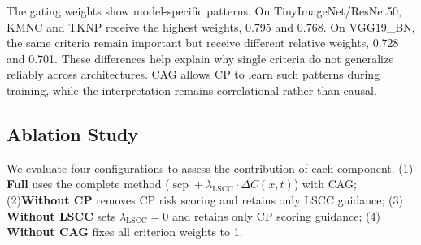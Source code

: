 \documentclass[preprint,number,5p,twocolumn]{elsarticle}
\DeclareMathOperator{\scp}{scp}
\begin{document}
\begin{table}[!htbp]
  \centering
  \caption{Criterion importance ranking on TinyImageNet. Higher values indicate greater contribution to fault prediction.}\label{tab:feature-importance}
\end{table}
The gating weights show model-specific patterns. On TinyImageNet/ResNet50, KMNC and TKNP receive the highest weights, 0.795 and 0.768. On VGG19\_BN, the same criteria remain important but receive different relative weights, 0.728 and 0.701. These differences help explain why single criteria do not generalize reliably across architectures. CAG allows CP to learn such patterns during training, while the interpretation remains correlational rather than causal.

\FloatBarrier
\subsection{Ablation Study}\label{sec:ablation}
We evaluate four configurations to assess the contribution of each component. (1) \textbf{Full} uses the complete method ($\scp + \lambda_{\mathrm{LSCC}} \cdot \Delta C(x, t)$) with CAG; (2)\textbf{Without CP} removes CP risk scoring and retains only LSCC guidance; (3) \textbf{Without LSCC} sets $\lambda_{\mathrm{LSCC}} = 0$ and retains only CP scoring guidance; (4) \textbf{Without CAG} fixes all criterion weights to 1.
\end{document}
